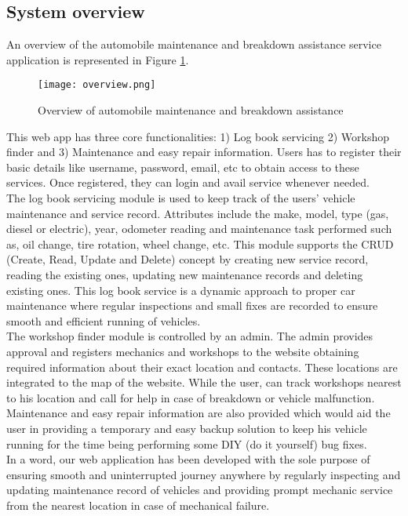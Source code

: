 \documentclass[11pt]{article} %
\begin{document}
	\subsection{System overview}
	An overview of the automobile maintenance and breakdown assistance service application is represented in Figure \ref{fig:overview}.
	\begin{figure}[!hbt]
        \texttt{[image: overview.png]}\par 
        \caption{Overview of automobile maintenance and breakdown assistance}
        \label{fig:overview}
    \end{figure}
	This web app has three core functionalities: 1) Log book servicing 2) Workshop finder and 3) Maintenance and easy repair information. 
	Users has to register their basic details like username, password, email, etc to obtain access to these services. Once registered, they can login and avail service whenever needed.\\
	The log book servicing module is used to keep track of the users' vehicle maintenance and service record. Attributes include the make, model, type (gas, diesel or electric), year, odometer reading and maintenance task performed such as, oil change, tire rotation, wheel change, etc. This module supports the CRUD (Create, Read, Update and Delete) concept by creating new service record, reading the existing ones, updating new maintenance records and deleting existing ones. This log book service is a dynamic approach to proper car maintenance where regular inspections and small fixes are recorded to ensure smooth and efficient running of vehicles.\\
	The workshop finder module is controlled by an admin. The admin provides approval and registers mechanics and workshops to the website obtaining required information about their exact location and contacts. These locations are integrated to the map of the website. While the user, can track workshops nearest to his location and call for help in case of breakdown or vehicle malfunction.\\
	Maintenance and easy repair information are also provided which would aid the user in providing a temporary and easy backup solution to keep his vehicle running for the time being performing some DIY (do it yourself) bug fixes.\\
	In a word, our web application has been developed with the sole purpose of ensuring smooth and uninterrupted journey anywhere by regularly inspecting and updating maintenance record of vehicles and providing prompt mechanic service from the nearest location in case of mechanical failure.
\end{document}
